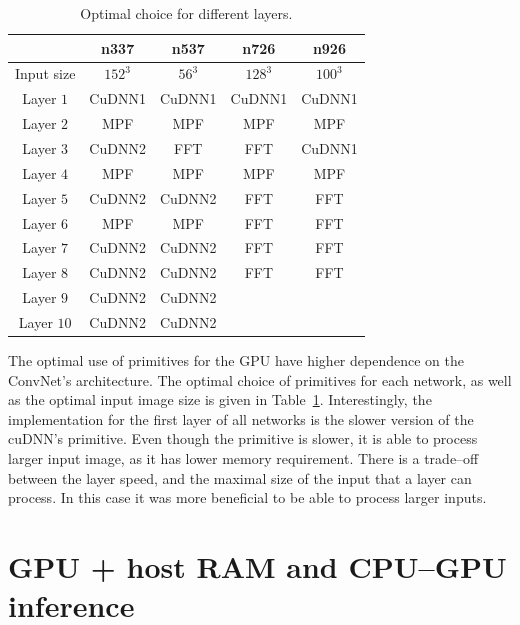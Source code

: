 \documentclass[conference]{./IEEEtran/IEEEtran}
\begin{document}
  \begin{table}
    {\footnotesize
    \centering
    \begin{tabular}{ccccc}
      \toprule
      & n337    & n537  &  n726  &  n926 \\
      \midrule
      Input size & $152^3$ &  $56^3$  & $128^3$  & $100^3$ \\
      \midrule
      Layer $1$  &  CuDNN1  &  CuDNN1  & CuDNN1   & CuDNN1  \\
      Layer $2$  &  MPF     &  MPF     & MPF      & MPF     \\
      Layer $3$  &  CuDNN2  &  FFT     & FFT      & CuDNN1  \\
      Layer $4$  &  MPF     &  MPF     & MPF      & MPF     \\
      Layer $5$  &  CuDNN2  &  CuDNN2  & FFT      & FFT     \\
      Layer $6$  &  MPF     &  MPF     & FFT      & FFT     \\
      Layer $7$  &  CuDNN2  &  CuDNN2  & FFT      & FFT     \\
      Layer $8$  &  CuDNN2  &  CuDNN2  & FFT      & FFT     \\
      Layer $9$  &  CuDNN2  &  CuDNN2  & & \\
      Layer $10$ &  CuDNN2  &  CuDNN2  & & \\
      \bottomrule
    \end{tabular}
    \caption{Optimal choice for different layers.}
    \label{table:gpu_optimal}
    }
  \end{table}

  The optimal use of primitives for the GPU have higher dependence on
  the ConvNet's architecture.  The optimal choice of primitives for
  each network, as well as the optimal input image size is given in
  Table~\ref{table:gpu_optimal}.  Interestingly, the implementation
  for the first layer of all networks is the slower version of the
  cuDNN's primitive.  Even though the primitive is slower, it is able
  to process larger input image, as it has lower memory requirement.
  There is a trade--off between the layer speed, and the maximal size
  of the input that a layer can process.  In this case it was more
  beneficial to be able to process larger inputs.



\section{GPU + host RAM and CPU--GPU inference}
\end{document}
